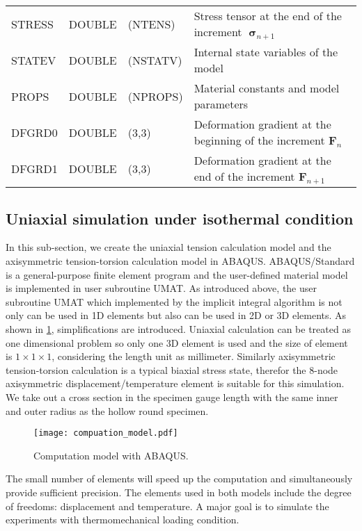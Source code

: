 \begin{table}[htbp]
\begin{tabular}{p{2cm}p{2cm}p{2cm}p{8cm}}
    STRESS & DOUBLE & (NTENS) & Stress tensor at the end of the increment $\bm{\upsigma}_{n+1}$ \\
    STATEV & DOUBLE & (NSTATV) & Internal state variables of the model \\
    PROPS & DOUBLE & (NPROPS) & Material constants and model parameters \\
    DFGRD0 & DOUBLE & (3,3) & Deformation gradient at the beginning of the increment $\bm{F}_n$ \\
    DFGRD1 & DOUBLE & (3,3) & Deformation gradient at the end of the increment $\bm{F}_{n+1}$ \\
    \bottomrule
    \end{tabular}%
  \label{tab:ABAQUS-UMAT_interface}%
\end{table}%

\subsection{Uniaxial simulation under isothermal condition}
In this sub-section, we create the uniaxial tension calculation model and the axisymmetric tension-torsion calculation model in ABAQUS.
ABAQUS/Standard is a general-purpose finite element program and the user-defined material model is implemented in user subroutine UMAT.
As introduced above, the user subroutine UMAT which implemented by the implicit integral algorithm is not only can be used in 1D elements but also can be used in 2D or 3D elements.
As shown in \ref{Fig:Compuation_model}, simplifications are introduced.
Uniaxial calculation can be treated as one dimensional problem so only one 3D element is used and the size of element is $1 \times 1 \times 1$, considering the length unit as millimeter.
Similarly axisymmetric tension-torsion calculation is a typical biaxial stress state, therefor the 8-node axisymmetric displacement/temperature element is suitable for this simulation.
We take out a cross section in the specimen gauge length with the same inner and outer radius as the hollow round specimen.

\begin{figure}[!htp]
\centering
\texttt{[image: compuation\_model.pdf]}
\caption{Computation model with ABAQUS.}
\label{Fig:Compuation_model}
\end{figure}

The small number of elements will speed up the computation and simultaneously provide sufficient precision.
The elements used in both models include the degree of freedoms: displacement and temperature.
A major goal is to simulate the experiments with thermomechanical loading condition.

